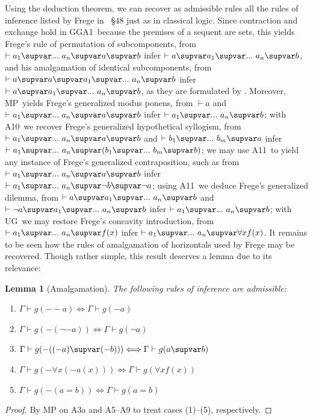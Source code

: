 \documentclass{preprint}
\newtheorem{lemma}[theorem]{Lemma}
\newcommand{\GGA}{\textsf{GGA1}}
\newcommand{\iiia}{A3a}%
\newcommand{\ahor}{A5}%
\newcommand{\aid}{A9}%
\newcommand{\hypsyll}{A10}%
\newcommand{\dilemma}{A11}
\renewcommand{\mp}{MP}%
\newcommand{\ug}{UG}%
\renewcommand{\to}{\supvar}
\begin{document}
\newpage
Using the deduction theorem, we can recover as admissible rules all the rules of inference listed by Frege in \gga~\S48 just as in classical logic. 
Since contraction and exchange hold in \GGA~because the premises of a sequent are sets, this yields Frege's rule of permutation of subcomponents, from $\vdash a_1 \to ...\ a_n \to a \to b$ infer $\vdash a \to a_1 \to ...\ a_n \to b$, and his amalgamation of identical subcomponents, from $\vdash a \to a \to a_1 \to ...\ a_n \to b$ infer $\vdash a \to a_1 \to ...\ a_n \to b$, as they are formulated by \citet[\S2.6]{landini2012frege}. 
Moreover, \mp~yields Frege's generalized modus ponens, from $\vdash a$ and $\vdash a_1 \to ...\ a_n \to a \to b$ infer $\vdash a_1 \to ...\ a_n \to b$; 
with \hypsyll~we recover Frege's generalized hypothetical syllogism, from $\vdash a_1 \to ...\ a_n \to a \to b$ and $\vdash b_1 \to ...\ b_m \to a$ infer $\vdash a_1 \to ...\ a_n \to (b_1 \to ...\ b_m \to b)$;
we may use \dilemma~to yield any instance of Frege's generalized contraposition, such as from $\vdash a_1 \to ...\ a_n \to a \to b$ infer $\vdash a_1 \to ...\ a_n \to \neg b \to \neg a$;
using \dilemma~we deduce Frege's generalized dilemma, from $\vdash a \to a_1 \to ...\ a_n \to b$ and $\vdash \neg a \to a_1 \to ...\ a_n \to b$ infer $\vdash a_1 \to ...\ a_n \to b$; 
with \ug~we may restore Frege's concavity introduction, from $\vdash a_1 \to ...\ a_n \to f(x)$ infer $\vdash a_1 \to ...\ a_n \to \forall x f(x)$. 
It remains to be seen how the rules of amalgamation of horizontals used by Frege may be recovered. Though rather simple, this result deserves a lemma due to its relevance:


\begin{lemma}[Amalgamation] \label{lem:inner-amal}
	The following rules of inference are admissible:
	\begin{enumerate}
		\item $\Gamma \vdash g(--a) \Longleftrightarrow \Gamma \vdash g(-a)$
		\item $\Gamma \vdash g(-(\neg -a)) \Longleftrightarrow \Gamma \vdash g(\neg a)$
		\item $\Gamma \vdash g(- ((-a) \to (- b))) \Longleftrightarrow \Gamma \vdash g(a \to b)$
		\item $\Gamma \vdash g(- \forall x (- a(x))) \Longleftrightarrow \Gamma \vdash g(\forall x f(x))$
		\item $\Gamma \vdash g(-(a = b)) \Longleftrightarrow \Gamma \vdash g(a = b)$
	\end{enumerate}
\end{lemma}
\begin{proof}
	By {\mp} on {\iiia} and {\ahor--\aid} to treat cases (1)--(5), respectively. 
\end{proof}
\end{document}
